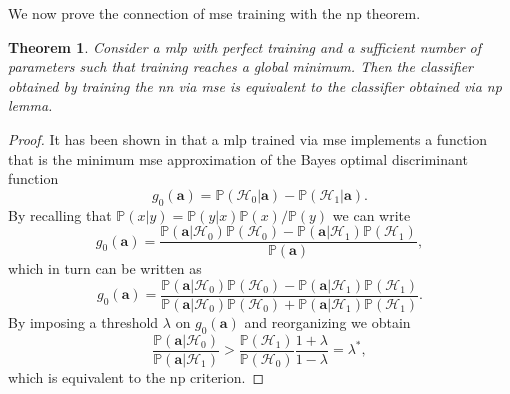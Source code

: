 \documentclass[draftcls,onecolumn,12pt]{IEEEtran}
\newtheorem{theorem}{Theorem}
\begin{document}
We now prove the connection of \ac{mse} training with the \ac{np} theorem.
\begin{theorem}
\label{th:nn_np}
Consider a \ac{mlp} with perfect training and a sufficient number of parameters such that training reaches a global minimum. Then the classifier obtained by training the \ac{nn} via \ac{mse} is equivalent to the classifier obtained via \ac{np} lemma.
\end{theorem}
\begin{proof}
It has been shown in \cite{Ruck-90} that a \ac{mlp} trained via \ac{mse} implements a function that is the minimum \ac{mse} approximation of the Bayes optimal discriminant function
\begin{equation}\label{eq:bayesDisc}
g_0(\bm{a}) = \mathbb{P}(\mathcal{H}_0|\bm{a}) - \mathbb{P}(\mathcal{H}_1|\bm{a}).
\end{equation} 
By recalling that $\mathbb{P}(x|y)=\mathbb{P}(y|x)\mathbb{P}(x)/\mathbb{P}(y)$ we can write
\begin{equation}
g_0(\bm{a}) = \frac{{\mathbb P}(\bm{a}|\mathcal H_0){\mathbb P}(\mathcal H_0) - {\mathbb P}(\bm{a}|\mathcal H_1){\mathbb P}(\mathcal H_1)}{\mathbb P(\bm{a})},
\end{equation}
which in turn can be written as
\begin{equation}
g_0(\bm{a}) = \frac{{\mathbb P}(\bm{a}|\mathcal H_0){\mathbb P}(\mathcal H_0) - {\mathbb P}(\bm{a}|\mathcal H_1){\mathbb P}(\mathcal H_1)}{{\mathbb P}(\bm{a}|\mathcal H_0){\mathbb P}(\mathcal H_0) + {\mathbb P}(\bm{a}|\mathcal H_1){\mathbb P}(\mathcal H_1)}.
\end{equation}
By imposing a threshold $\lambda$ on $g_0(\bm{a})$ and reorganizing we obtain
\begin{equation}
\frac{{\mathbb P}(\bm{a}|\mathcal H_0)}{{\mathbb P}(\bm{a}|\mathcal H_1)}>   \frac{{\mathbb P}(\mathcal H_1)}{{\mathbb P}(\mathcal H_0)} \frac{1 + \lambda}{1-\lambda} = \lambda^*,
\end{equation}
which is equivalent to the \ac{np} criterion.
\end{proof}
\end{document}
